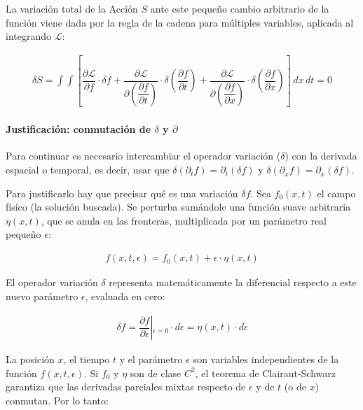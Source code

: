 \documentclass[
  spanish,
]{article}
\begin{document}
La variación total de la Acción \(S\) ante este pequeño cambio
arbitrario de la función viene dada por la regla de la cadena para
múltiples variables, aplicada al integrando \(\mathcal{L}\):

\[
\begin{aligned}
\delta S = \int \int \left[ \dfrac{\partial \mathcal{L}}{\partial f} \cdot \delta f + \dfrac{\partial \mathcal{L}}{\partial \left( \dfrac{\partial f}{\partial t} \right)} \cdot \delta \left( \dfrac{\partial f}{\partial t} \right) + \dfrac{\partial \mathcal{L}}{\partial \left( \dfrac{\partial f}{\partial x} \right)} \cdot \delta \left( \dfrac{\partial f}{\partial x} \right) \right] \, dx \, dt = 0
\end{aligned}
\]

\paragraph{\texorpdfstring{Justificación: conmutación de \(\delta\) y
\(\partial\)}{Justificación: conmutación de \textbackslash delta y \textbackslash partial}}\label{justificaciuxf3n-conmutaciuxf3n-de-delta-y-partial}

Para continuar es necesario intercambiar el operador variación
(\(\delta\)) con la derivada espacial o temporal, es decir, usar que
\(\delta(\partial_t f) = \partial_t (\delta f)\) y
\(\delta(\partial_x f) = \partial_x (\delta f)\).

Para justificarlo hay que precisar qué es una variación \(\delta f\).
Sea \(f_0(x,t)\) el campo físico (la solución buscada). Se perturba
sumándole una función suave arbitraria \(\eta(x,t)\), que se anula en
las fronteras, multiplicada por un parámetro real pequeño \(\epsilon\):

\[
\begin{aligned}
f(x,t,\epsilon) = f_0(x,t) + \epsilon \cdot \eta(x,t)
\end{aligned}
\]

El operador variación \(\delta\) representa matemáticamente la
diferencial respecto a este nuevo parámetro \(\epsilon\), evaluada en
cero:

\[
\begin{aligned}
\delta f = \left. \dfrac{\partial f}{\partial \epsilon} \right\vert{}_{\epsilon=0} \cdot d\epsilon = \eta(x,t) \cdot d\epsilon
\end{aligned}
\]

La posición \(x\), el tiempo \(t\) y el parámetro \(\epsilon\) son
variables independientes de la función \(f(x,t,\epsilon)\). Si \(f_0\) y
\(\eta\) son de clase \(C^2\), el teorema de Clairaut-Schwarz garantiza
que las derivadas parciales mixtas respecto de \(\epsilon\) y de \(t\)
(o de \(x\)) conmutan. Por lo tanto:
\end{document}
